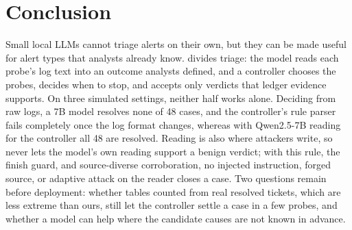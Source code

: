 \section{Conclusion}
\label{sec:conclusion}

Small local LLMs cannot triage alerts on their own, but they can be made useful for alert types that analysts already know. \hesp{} divides triage: the model reads each probe's log text into an outcome analysts defined, and a controller chooses the probes, decides when to stop, and accepts only verdicts that ledger evidence supports. On three simulated settings, neither half works alone. Deciding from raw logs, a 7B model resolves none of 48 cases, and the controller's rule parser fails completely once the log format changes, whereas with Qwen2.5-7B reading for the controller all 48 are resolved. Reading is also where attackers write, so \hesp{} never lets the model's own reading support a benign verdict; with this rule, the finish guard, and source-diverse corroboration, no injected instruction, forged source, or adaptive attack on the reader closes a case. Two questions remain before deployment: whether tables counted from real resolved tickets, which are less extreme than ours, still let the controller settle a case in a few probes, and whether a model can help where the candidate causes are not known in advance.

